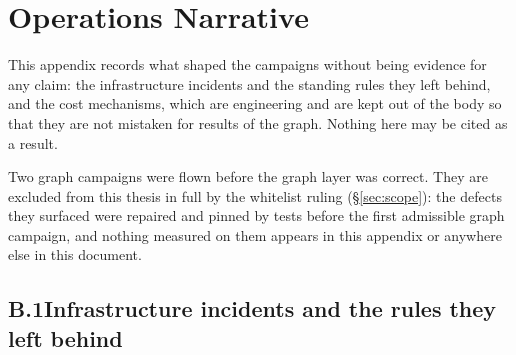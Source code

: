 \chapter{Operations Narrative}
\label{app:ops}

This appendix records what shaped the campaigns without being evidence for
any claim: the infrastructure incidents and the standing rules they left
behind, and the cost mechanisms, which are engineering and are kept out of
the body so that they are not mistaken for results of the graph. Nothing
here may be cited as a result.

Two graph campaigns were flown before the graph layer was correct. They
are excluded from this thesis in full by the whitelist ruling
(\S\ref{sec:scope}): the defects they surfaced were repaired and pinned by
tests before the first admissible graph campaign, and nothing measured on
them appears in this appendix or anywhere else in this document.

\section*{B.1\quad Infrastructure incidents and the rules they left behind}

